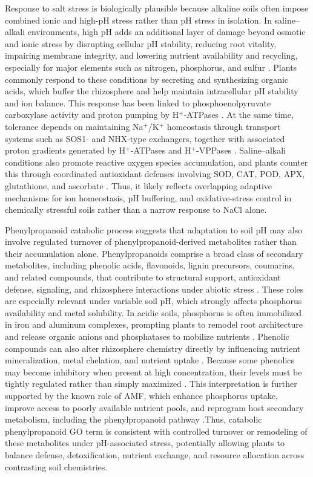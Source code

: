 \documentclass[unnumsec,webpdf,contemporary,large]{oup-authoring-template}%
\theoremstyle{thmstyleone}%
\theoremstyle{thmstyletwo}%
\theoremstyle{thmstylethree}%
\begin{document}
Response to salt stress is biologically plausible because alkaline soils often impose combined ionic and high-pH stress rather than pH stress in isolation. In saline--alkali environments, high pH adds an additional layer of damage beyond osmotic and ionic stress by disrupting cellular pH stability, reducing root vitality, impairing membrane integrity, and lowering nutrient availability and recycling, especially for major elements such as nitrogen, phosphorus, and sulfur \citep{Fang2021,LuFricke2023}. Plants commonly respond to these conditions by secreting and synthesizing organic acids, which buffer the rhizosphere and help maintain intracellular pH stability and ion balance. This response has been linked to phosphoenolpyruvate carboxylase activity and proton pumping by H$^{+}$-ATPases \citep{Fang2021}. At the same time, tolerance depends on maintaining Na$^{+}$/K$^{+}$ homeostasis through transport systems such as SOS1- and NHX-type exchangers, together with associated proton gradients generated by H$^{+}$-ATPases and H$^{+}$-VPPases \citep{Fang2021,Zhao2020}. Saline--alkali conditions also promote reactive oxygen species accumulation, and plants counter this through coordinated antioxidant defenses involving SOD, CAT, POD, APX, glutathione, and ascorbate \citep{Fang2021,Zhao2020}. Thus, it likely reflects overlapping adaptive mechanisms for ion homeostasis, pH buffering, and oxidative-stress control in chemically stressful soils rather than a narrow response to NaCl alone.

Phenylpropanoid catabolic process suggests that adaptation to soil pH may also involve regulated turnover of phenylpropanoid-derived metabolites rather than their accumulation alone. Phenylpropanoids comprise a broad class of secondary metabolites, including phenolic acids, flavonoids, lignin precursors, coumarins, and related compounds, that contribute to structural support, antioxidant defense, signaling, and rhizosphere interactions under abiotic stress \citep{Sharma2019}. These roles are especially relevant under variable soil pH, which strongly affects phosphorus availability and metal solubility. In acidic soils, phosphorus is often immobilized in iron and aluminum complexes, prompting plants to remodel root architecture and release organic anions and phosphatases to mobilize nutrients \citep{KaurSuseela2020}. Phenolic compounds can also alter rhizosphere chemistry directly by influencing nutrient mineralization, metal chelation, and nutrient uptake \citep{Sharma2019}. Because some phenolics may become inhibitory when present at high concentration, their levels must be tightly regulated rather than simply maximized \citep{Sharma2019}. This interpretation is further supported by the known role of AMF, which enhance phosphorus uptake, improve access to poorly available nutrient pools, and reprogram host secondary metabolism, including the phenylpropanoid pathway \citep{Jajoo2021,KaurSuseela2020}.Thus, catabolic phenylpropanoid GO term is consistent with controlled turnover or remodeling of these metabolites under pH-associated stress, potentially allowing plants to balance defense, detoxification, nutrient exchange, and resource allocation across contrasting soil chemistries.
\end{document}
